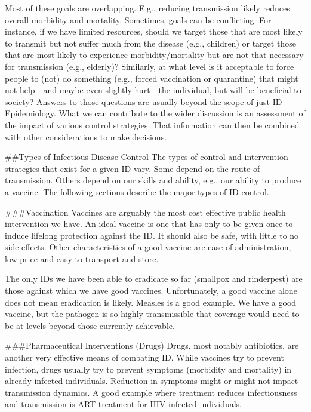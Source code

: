\documentclass[]{book}
\theoremstyle{definition}
\theoremstyle{definition}
\theoremstyle{definition}
\theoremstyle{remark}
\begin{document}
Most of these goals are overlapping. E.g., reducing transmission likely
reduces overall morbidity and mortality. Sometimes, goals can be
conflicting. For instance, if we have limited resources, should we
target those that are most likely to transmit but not suffer much from
the disease (e.g., children) or target those that are most likely to
experience morbidity/mortality but are not that necessary for
transmission (e.g., elderly)? Similarly, at what level is it acceptable
to force people to (not) do something (e.g., forced vaccination or
quarantine) that might not help - and maybe even slightly hurt - the
individual, but will be beneficial to society? Answers to those
questions are usually beyond the scope of just ID Epidemiology. What we
can contribute to the wider discussion is an assessment of the impact of
various control strategies. That information can then be combined with
other considerations to make decisions.

\#\#Types of Infectious Disease Control The types of control and
intervention strategies that exist for a given ID vary. Some depend on
the route of transmission. Others depend on our skills and ability,
e.g., our ability to produce a vaccine. The following sections describe
the major types of ID control.

\#\#\#Vaccination Vaccines are arguably the most cost effective public
health intervention we have. An ideal vaccine is one that has only to be
given once to induce lifelong protection against the ID. It should also
be safe, with little to no side effects. Other characteristics of a good
vaccine are ease of administration, low price and easy to transport and
store.

The only IDs we have been able to eradicate so far (smallpox and
rinderpest) are those against which we have good vaccines.
Unfortunately, a good vaccine alone does not mean eradication is likely.
Measles is a good example. We have a good vaccine, but the pathogen is
so highly transmissible that coverage would need to be at levels beyond
those currently achievable.

\#\#\#Pharmaceutical Interventions (Drugs) Drugs, most notably
antibiotics, are another very effective means of combating ID. While
vaccines try to prevent infection, drugs usually try to prevent symptoms
(morbidity and mortality) in already infected individuals. Reduction in
symptoms might or might not impact transmission dynamics. A good example
where treatment reduces infectiousness and transmission is ART treatment
for HIV infected individuals.
\end{document}
